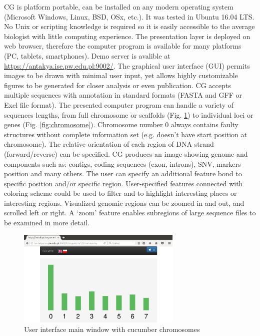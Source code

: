 \documentclass[]{spie}
\newcommand{\appShortcut}{CG}
\begin{document}
\appShortcut{} is platform portable, can be installed on any modern operating system (Microsoft Windows, Linux, BSD, OSx, etc.).
It was tested in Ubuntu 16.04 LTS.
No Unix or scripting knowledge is required so it is easily accessible to the average biologist with little computing experience.
The presentation layer is deployed on web browser, therefore the computer program is available for many platforms (PC, tablets, smartphones).
Demo server is avalible at \url{https://antakya.ise.pw.edu.pl:9002/}.
The graphical user interface (GUI) permits images to be drawn with minimal user input,
yet allows highly customizable figures to be generated for closer analysis or even publication.
\appShortcut{} accepts multiple sequences with annotation in standard formats (FASTA and GFF or Exel file format).
The presented computer program can handle a variety of sequences lengths, from full chromosome or scaffolds  (Fig. \ref{fig:organism})
to individual loci or genes (Fig. \ref{fig:chromosome}). Chromosome number 0 always contains faulty structures without complete information set (e.g. doesn't have start position at chromosome).
The relative orientation of each region of DNA strand (forward/reverse) can be specified.
\appShortcut{} produces an image showing genome and components such as: contigs, coding sequences (exon, introns), SNV, markers position and many others.
The user can specify an additional feature bond to specific position and/or specific region.
User-specified features connected with coloring scheme could be used to filter and to highlight interesting places or interesting regions.
Visualized genomic regions can be zoomed in and out, and scrolled left or right.
A ‘zoom’ feature enables subregions of large sequence files to be examined in more detail.

\begin{figure}[htp]
  \centering
  \includegraphics[width=0.7\textwidth]{img/chromosomy.png}
  \caption{User interface main window with cucumber chromosomes}
  \label{fig:organism}
\end{figure}
\end{document}
